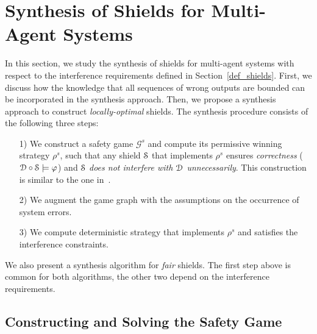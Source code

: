 \section{Synthesis of Shields for Multi-Agent Systems}
\label{sec_synth}

In this section, we study the synthesis of
shields for multi-agent systems with respect to the interference requirements defined in Section~\ref{def_shields}.
First, we discuss how the knowledge that all sequences of wrong outputs are bounded can be incorporated
in the synthesis approach. 
%
Then, we propose a synthesis approach to construct \emph{locally-optimal} shields. 
The synthesis procedure consists of the following three steps:
\begin{itemize}
  \item[1)] We construct a safety game $\mathcal G^s$ and compute its permissive winning strategy $\rho^s$, such that any shield $\mathcal{S}$ that implements $\rho^s$ ensures \emph{correctness} ($\mathcal{D} \circ \mathcal{S} \models \varphi$) and $\mathcal{S}$
      \emph{does not interfere with $\mathcal{D}$ unnecessarily}. This construction is similar to the one  in~\cite{KonighoferABHKT17}.
  \item[2)] We augment the game graph with the assumptions on the occurrence of system errors.
  \item[3)] We compute deterministic strategy that implements $\rho^s$ and 
  satisfies the  interference constraints.
\end{itemize}
\iffalse MEAN-PAYOFF
The synthesis algorithms for \emph{$c_{\mathsf{mp}}$-optimal} shields and  \emph{fair} shields are presented in Appendix~\ref{appx:synthesis-mp} and Appendix~\ref{appx:synthesis-fair}. The first step is common for all algorithms, and the other two depend on the interference requirements.
\fi
We also present a synthesis algorithm for \emph{fair} shields. The first step above is common for both algorithms, the other two depend on the interference requirements.

\subsection{Constructing and Solving the Safety Game}

